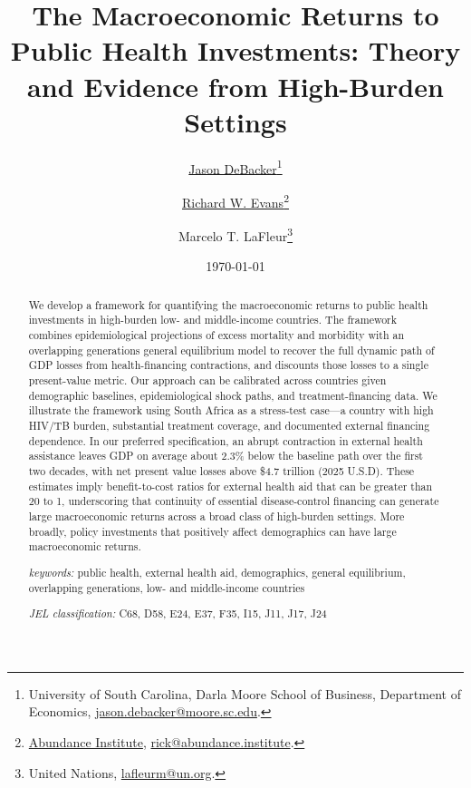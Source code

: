 \documentclass[letterpaper,12pt]{article}
\theoremstyle{definition}
\begin{document}
\hypersetup{pageanchor=false}
\begin{titlepage}
\title{The Macroeconomic Returns to Public Health Investments: Theory and Evidence from High-Burden Settings}
\date{\today}
\author{\href{http://jasondebacker.com/}{Jason DeBacker}\thanks{University of South Carolina, Darla Moore School of Business, Department of Economics, \href{mailto:jason.debacker@moore.sc.edu}{jason.debacker@moore.sc.edu}.}\and \href{https://sites.google.com/site/rickecon}{Richard W. Evans}\thanks{\href{https://abundance.institute/}{Abundance Institute}, \href{mailto:rick@abundance.institute}{rick@abundance.institute}.}\and Marcelo T. LaFleur\thanks{United Nations, \href{mailto:lafleurm@un.org}{lafleurm@un.org}.}}
\maketitle
\vspace{-2mm}
\begin{abstract}
\small{We develop a framework for quantifying the macroeconomic returns to public health investments in high-burden low- and middle-income countries. The framework combines epidemiological projections of excess mortality and morbidity with an overlapping generations general equilibrium model to recover the full dynamic path of GDP losses from health-financing contractions, and discounts those losses to a single present-value metric. Our approach can be calibrated across countries given demographic baselines, epidemiological shock paths, and treatment-financing data. We illustrate the framework using South Africa as a stress-test case---a country with high HIV/TB burden, substantial treatment coverage, and documented external financing dependence. In our preferred specification, an abrupt contraction in external health assistance leaves GDP on average about 2.3\% below the baseline path over the first two decades, with net present value losses above \$4.7 trillion (2025 U.S.D). These estimates imply benefit-to-cost ratios for external health aid that can be greater than 20 to 1, underscoring that continuity of essential disease-control financing can generate large macroeconomic returns across a broad class of high-burden settings. More broadly, policy investments that positively affect demographics can have large macroeconomic returns.}

\vspace{10mm}

\noindent\textit{keywords:}\: public health, external health aid, demographics, general equilibrium, overlapping generations, low- and middle-income countries

\vspace{10mm}

\noindent\textit{JEL classification:} C68, D58, E24, E37, F35, I15, J11, J17, J24


\end{abstract}
\thispagestyle{empty}
\end{titlepage}
\hypersetup{pageanchor=true}
\end{document}
